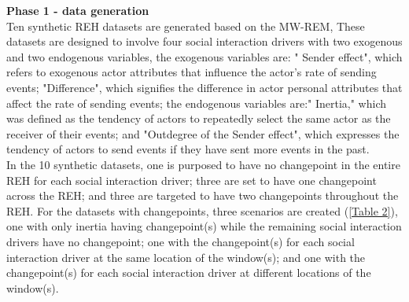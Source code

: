 \documentclass[]{interact}
\theoremstyle{plain}%
\theoremstyle{definition}
\theoremstyle{remark}
\begin{document}
\hspace{-0.55cm} \textbf{Phase 1 - data generation}\\

Ten synthetic REH datasets are generated based on the MW-REM, These datasets are designed to involve four social interaction drivers with two exogenous and two endogenous variables, the exogenous variables are: " Sender effect", which refers to exogenous actor attributes that influence the actor's rate of sending events; "Difference", which signifies the difference in actor personal attributes that affect the rate of sending events; the endogenous variables are:" Inertia," which was defined as the tendency of actors to repeatedly select the same actor as the receiver of their events; and "Outdegree of the Sender effect", which expresses the tendency of actors to send events if they have sent more events in the past. \\

In the 10 synthetic datasets, one is purposed to have no changepoint in the entire REH for each social interaction driver; three are set to have one changepoint across the REH; and three are targeted to have two changepoints throughout the REH. For the datasets with changepoints, three scenarios are created (\autoref{Table 2}), one with only inertia having changepoint(s) while the remaining social interaction drivers have no changepoint; one with the changepoint(s) for each social interaction driver at the same location of the window(s); and one with the changepoint(s) for each social interaction driver at different locations of the window(s). \\
\end{document}
